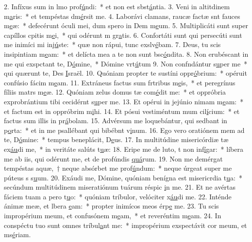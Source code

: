 2. Infíxus sum in lmo prof\uline{ú}ndi:~* et non est sbst\uline{á}ntia.
3. Veni in altitdinem m\uline{a}ris:~* et tempéstas dm\uline{é}rsit me.
4. Laborávi clamans, raucæ factæ snt fauces m\uline{e}æ:~* defecérunt óculi mei, dum spero in Dem m\uline{e}um.
5. Multiplicáti sunt super capíllos cpitis m\uline{e}i,~* qui odérunt m gr\uline{a}tis.
6. Confortáti sunt qui persecúti sunt me inimíci mi inj\uline{ú}ste:~* quæ non rápui, tunc exslv\uline{é}bam.
7. Deus, tu scis insipintiam m\uline{e}am:~* et delícta mea a te non sunt bsc\uline{ó}ndita.
8. Non erubéscant in me qui exspctant te, D\uline{ó}mine,~* Dómine vrt\uline{ú}tum
9. Non confndántur s\uline{u}per me~* qui quærunt te, Des \uline{I}sraël.
10. Quóniam propter te sustíni oppr\uline{ó}brium:~* opéruit confúsio fácim m\uline{e}am.
11. Extráneus factus sum frtribus m\uline{e}is,~* et peregrínus fíliis matrs m\uline{e}æ.
12. Quóniam zelus domus tæ com\uline{é}dit me:~* et oppróbria exprobrántium tibi cecidérnt s\uline{u}per me.
13. Et opérui in jejúnio nimam m\uline{e}am:~* et factum est in oppróbrim m\uline{i}hi.
14. Et pósui vestiméntum mum cil\uline{í}cium:~* et factus sum illis in pr\uline{á}bolam.
15. Advérsum me loquebántur, qui sedbant in p\uline{o}rta:~* et in me psallébant qui bibébnt v\uline{i}num.
16. Ego vero oratiónem mem ad te, D\uline{ó}mine:~* tempus beneplácit, D\uline{e}us.
17. In multitúdine misericórdiæ tæ ex\uline{áu}di me,~* in veritáte salúts t\uline{u}æ:
18. Eripe me de luto, t non inf\uline{í}gar:~* líbera me ab iis, qui odérunt me, et de profúndis \uline{quá}rum.
19. Non me demérgat tempéstas aquæ,~† neque absórbet me prof\uline{ú}ndum:~* neque úrgeat super me púteus s s\uline{u}um.
20. Exáudi me, Dómine, quóniam benígna est misericrdia t\uline{u}a:~* secúndum multitúdinem miseratiónum tuárum réspic \uline{i}n me.
21. Et ne avértas fáciem tuam a pero t\uline{u}o:~* quóniam tríbulor, velóciter x\uline{áu}di me.
22. Inténde ánimæ meæ, et lbera \uline{e}am:~* propter inimícos meos érp\uline{e} me.
23. Tu scis impropérium meum, et confusónem m\uline{e}am,~* et reveréntim m\uline{e}am.
24. In conspéctu tuo sunt omnes  tríbul\uline{a}nt me:~* impropérium exspectávit cor meum, et ms\uline{é}riam.

